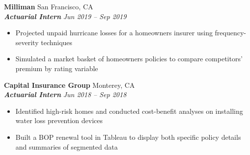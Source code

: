 \documentclass[11pt,letterpaper]{article}
\newcommand{\smallspace}{\vspace{6pt}}
\begin{document}
\textbf{Milliman} \hfill San Francisco, CA \\
\textbf{\textit{Actuarial Intern}} \hfill \textit{Jun 2019 -- Sep 2019}
\begin{itemize}
	\item Projected unpaid hurricane losses for a homeowners insurer using frequency-severity techniques
	\item Simulated a market basket of homeowners policies to compare competitors' premium by rating variable
\end{itemize}
\smallspace 
\textbf{Capital Insurance Group} \hfill Monterey, CA \\
\textbf{\textit{Actuarial Intern}} \hfill \textit{Jun 2018 -- Sep 2018}
\begin{itemize}
	\item Identified high-risk homes and conducted cost-benefit analyses on installing water loss prevention devices
	\item Built a BOP renewal tool in Tableau to display both specific policy details and summaries of segmented data	
\end{itemize}
\end{document}
